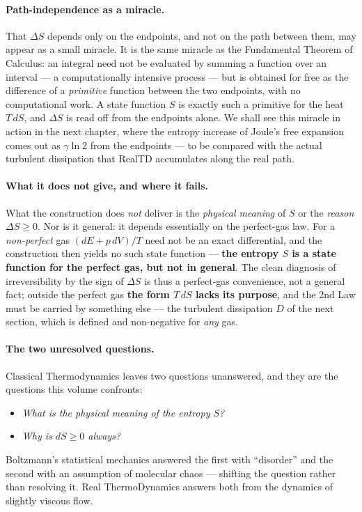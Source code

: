 \paragraph{Path-independence as a miracle.}
That $\Delta S$ depends only on the endpoints, and not on the path between them,
may appear as a small miracle. It is the same miracle as the Fundamental Theorem
of Calculus: an integral need not be evaluated by summing a function over an
interval --- a computationally intensive process --- but is obtained for free as
the difference of a \emph{primitive} function between the two endpoints, with no
computational work. A state function $S$ is exactly such a primitive for the
heat $T\,dS$, and $\Delta S$ is read off from the endpoints alone. We shall see
this miracle in action in the next chapter, where the entropy increase of
Joule's free expansion comes out as $\gamma\ln 2$ from the endpoints --- to be
compared with the actual turbulent dissipation that RealTD accumulates along the
real path.

\paragraph{What it does not give, and where it fails.}
What the construction does \emph{not} deliver is the \emph{physical meaning} of
$S$ or the \emph{reason} $\Delta S \ge 0$. Nor is it general: it depends
essentially on the perfect-gas law. For a \emph{non-perfect} gas $(dE + p\,dV)/T$
need not be an exact differential, and the construction then yields no such state
function --- \textbf{the entropy $S$ is a state function for the perfect gas, but
not in general}. The clean diagnosis of irreversibility by the sign of $\Delta S$
is thus a perfect-gas convenience, not a general fact; outside the perfect gas
\textbf{the form $T\,dS$ lacks its purpose}, and the 2nd Law must be carried by
something else --- the turbulent dissipation $D$ of the next section, which is
defined and non-negative for \emph{any} gas.

\paragraph{The two unresolved questions.}
Classical Thermodynamics leaves two questions unanswered, and they are
the questions this volume confronts:
\begin{itemize}
\item \emph{What is the physical meaning of the entropy $S$?}
\item \emph{Why is $dS \ge 0$ always?}
\end{itemize}
Boltzmann's statistical mechanics answered the first with ``disorder''
and the second with an assumption of molecular chaos --- shifting the
question rather than resolving it. Real ThermoDynamics answers both from
the dynamics of slightly viscous flow.

